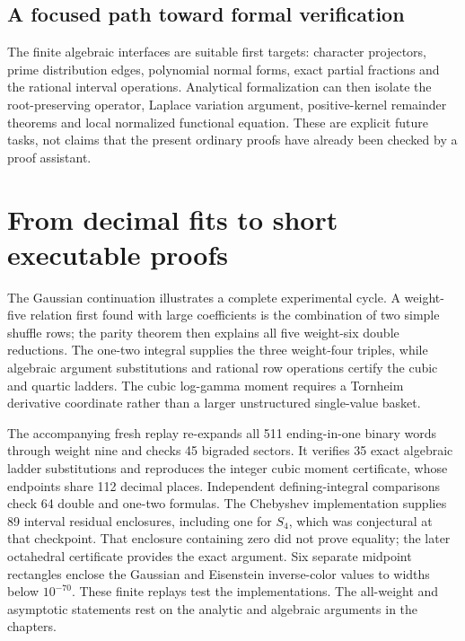 \subsection{A focused path toward formal verification}
The finite algebraic interfaces are suitable first targets: character
projectors, prime distribution edges, polynomial normal forms, exact
partial fractions and the rational interval operations. Analytical
formalization can then isolate the root-preserving operator, Laplace
variation argument, positive-kernel remainder theorems and local normalized
functional equation. These are explicit future tasks, not claims that the
present ordinary proofs have already been checked by a proof assistant.


\section{From decimal fits to short executable proofs}
The Gaussian continuation illustrates a complete experimental cycle. A
weight-five relation first found with large coefficients is the combination
of two simple shuffle rows; the parity theorem then explains all five
weight-six double reductions. The one-two integral supplies the three
weight-four triples, while algebraic argument substitutions and rational
row operations certify the cubic and quartic ladders. The cubic log-gamma
moment requires a Tornheim derivative coordinate rather than a larger
unstructured single-value basket.

The accompanying fresh replay re-expands all 511 ending-in-one binary
words through weight nine and checks 45 bigraded sectors. It verifies 35
exact algebraic ladder substitutions and reproduces the integer cubic
moment certificate, whose endpoints share 112 decimal places. Independent
defining-integral comparisons check 64 double and one-two formulas. The
Chebyshev implementation supplies 89 interval residual enclosures, including
one for $S_4$, which was conjectural at that checkpoint. That enclosure
containing zero did not prove equality; the later octahedral certificate
provides the exact argument. Six separate midpoint rectangles enclose the
Gaussian and Eisenstein inverse-color values to widths below $10^{-70}$.
These finite replays test the implementations. The all-weight and asymptotic
statements rest on the analytic and algebraic arguments in the chapters.


